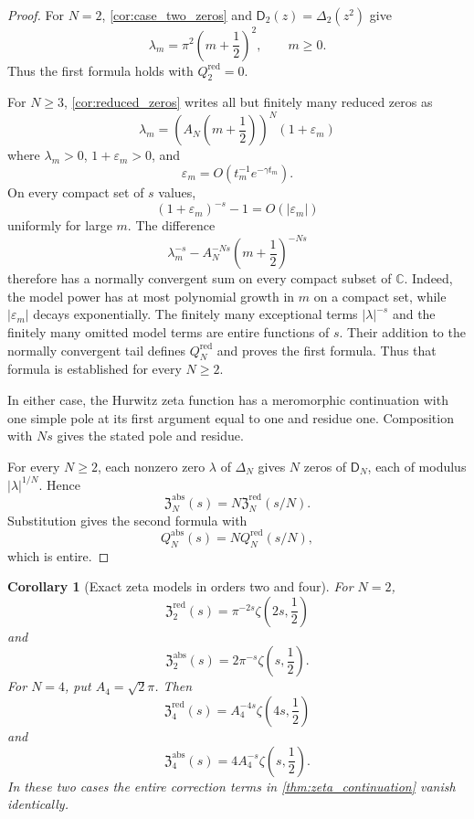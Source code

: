 \documentclass[11pt,letterpaper]{article}
\newtheorem{corollary}[corollary]{Corollary}
\theoremstyle{definition}
\theoremstyle{remark}
\newcommand{\CC}{\mathbb C}
\newcommand{\Dfun}{\mathsf D}
\begin{document}
\begin{proof}
For $N=2$, \cref{cor:case_two_zeros} and
$\Dfun_2(z)=\Delta_2(z^2)$ give
\[
\lambda_m=\pi^2\left(m+\frac12\right)^2,
\qquad m\geq0.
\]
Thus the first formula holds with $Q_2^{\mathrm{red}}=0$.

For $N\geq3$, \cref{cor:reduced_zeros} writes all but finitely many reduced zeros as
\[
\lambda_m
=
\left(A_N\left(m+\frac12\right)\right)^N(1+\varepsilon_m)
\]
where $\lambda_m>0$, $1+\varepsilon_m>0$, and
\[
\varepsilon_m
=
O\left(t_m^{-1}e^{-\gamma t_m}\right).
\]
On every compact set of $s$ values,
\[
(1+\varepsilon_m)^{-s}-1
=
O(|\varepsilon_m|)
\]
uniformly for large $m$.  The difference
\[
\lambda_m^{-s}
-
A_N^{-Ns}\left(m+\frac12\right)^{-Ns}
\]
therefore has a normally convergent sum on every compact subset of
$\CC$.  Indeed, the model power has at most polynomial growth in $m$
on a compact set, while $|\varepsilon_m|$ decays exponentially.  The
finitely many exceptional terms $|\lambda|^{-s}$ and the finitely many
omitted model terms are entire functions of $s$.  Their addition to the
normally convergent tail defines $Q_N^{\mathrm{red}}$ and proves the
first formula. Thus that formula is established for every $N\geq2$.

In either case, the Hurwitz zeta function has a meromorphic continuation with one simple pole at its first argument equal to one and residue one.  Composition with $Ns$ gives the stated pole and residue.

For every $N\geq2$, each nonzero zero $\lambda$ of $\Delta_N$ gives $N$ zeros of $\Dfun_N$, each of modulus $|\lambda|^{1/N}$.  Hence
\[
\mathfrak Z_N^{\mathrm{abs}}(s)
=
N\mathfrak Z_N^{\mathrm{red}}(s/N).
\]
Substitution gives the second formula with
\[
Q_N^{\mathrm{abs}}(s)=NQ_N^{\mathrm{red}}(s/N),
\]
which is entire.
\end{proof}

\begin{corollary}[Exact zeta models in orders two and four]\label{cor:exact_zeta_models}
For $N=2$,
\[
\mathfrak Z_2^{\mathrm{red}}(s)
=
\pi^{-2s}\zeta\left(2s,\frac12\right)
\]
and
\[
\mathfrak Z_2^{\mathrm{abs}}(s)
=
2\pi^{-s}\zeta\left(s,\frac12\right).
\]
For $N=4$, put $A_4=\sqrt2\pi$.  Then
\[
\mathfrak Z_4^{\mathrm{red}}(s)
=
A_4^{-4s}\zeta\left(4s,\frac12\right)
\]
and
\[
\mathfrak Z_4^{\mathrm{abs}}(s)
=
4A_4^{-s}\zeta\left(s,\frac12\right).
\]
In these two cases the entire correction terms in \cref{thm:zeta_continuation} vanish identically.
\end{corollary}
\end{document}
